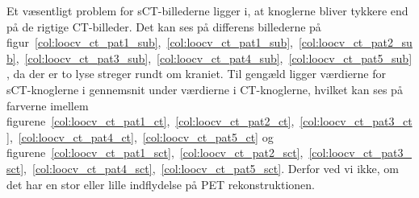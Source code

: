 Et væsentligt problem for sCT-billederne ligger i, at knoglerne bliver tykkere end på de rigtige CT-billeder. Det kan ses på differens billederne på figur~\ref{col:loocv_ct_pat1_sub},~\ref{col:loocv_ct_pat1_sub},~\ref{col:loocv_ct_pat2_sub},~\ref{col:loocv_ct_pat3_sub},~\ref{col:loocv_ct_pat4_sub},~\ref{col:loocv_ct_pat5_sub}, da der er to lyse streger rundt om kraniet. Til gengæld ligger værdierne for sCT-knoglerne i gennemsnit under værdierne i CT-knoglerne, hvilket kan ses på farverne imellem figurene~\ref{col:loocv_ct_pat1_ct},~\ref{col:loocv_ct_pat2_ct},~\ref{col:loocv_ct_pat3_ct},~\ref{col:loocv_ct_pat4_ct},~\ref{col:loocv_ct_pat5_ct} og figurene~\ref{col:loocv_ct_pat1_sct},~\ref{col:loocv_ct_pat2_sct},~\ref{col:loocv_ct_pat3_sct},~\ref{col:loocv_ct_pat4_sct},~\ref{col:loocv_ct_pat5_sct}. Derfor ved vi ikke, om det har en stor eller lille indflydelse på PET rekonstruktionen.

